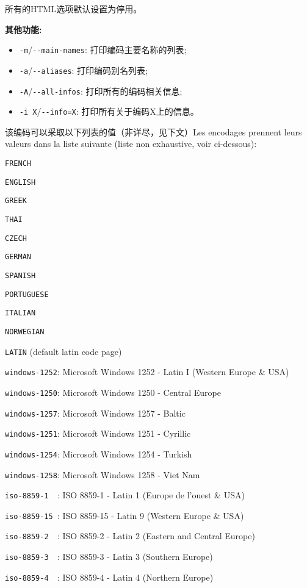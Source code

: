 \noindent 所有的HTML选项默认设置为停用。

\bigskip
\noindent \textbf{其他功能:}
\begin{itemize}
\item \verb+-m+/\verb+--main-names+: 打印编码主要名称的列表;
\item \verb+-a+/\verb+--aliases+: 打印编码别名列表;
\item \verb+-A+/\verb+--all-infos+: 打印所有的编码相关信息;
\item \verb+-i X+/\verb+--info=X+: 打印所有关于编码X上的信息。
\end{itemize}

\bigskip
\noindent 
该编码可以采取以下列表的值（非详尽，见下文）Les encodages prennent leurs valeurs dans la liste suivante  (liste non exhaustive, voir
	ci-dessous):

\bigskip
\verb$FRENCH$

\verb$ENGLISH$

\verb$GREEK$

\verb$THAI$

\verb$CZECH$

\verb$GERMAN$

\verb$SPANISH$

\verb$PORTUGUESE$

\verb$ITALIAN$

\verb$NORWEGIAN$

\verb$LATIN$ (default latin code page)

\verb$windows-1252$: Microsoft Windows 1252 - Latin I (Western Europe \& USA)

\verb$windows-1250$: Microsoft Windows 1250 - Central Europe

\verb$windows-1257$: Microsoft Windows 1257 - Baltic

\verb$windows-1251$: Microsoft Windows 1251 - Cyrillic

\verb$windows-1254$: Microsoft Windows 1254 - Turkish

\verb$windows-1258$: Microsoft Windows 1258 - Viet Nam

\verb$iso-8859-1  $: ISO 8859-1  - Latin 1 (Europe de l'ouest \& USA)

\verb$iso-8859-15 $: ISO 8859-15 - Latin 9 (Western Europe \& USA)

\verb$iso-8859-2  $: ISO 8859-2  - Latin 2 (Eastern and Central Europe)

\verb$iso-8859-3  $: ISO 8859-3  - Latin 3 (Southern Europe)

\verb$iso-8859-4  $: ISO 8859-4  - Latin 4 (Northern Europe)

